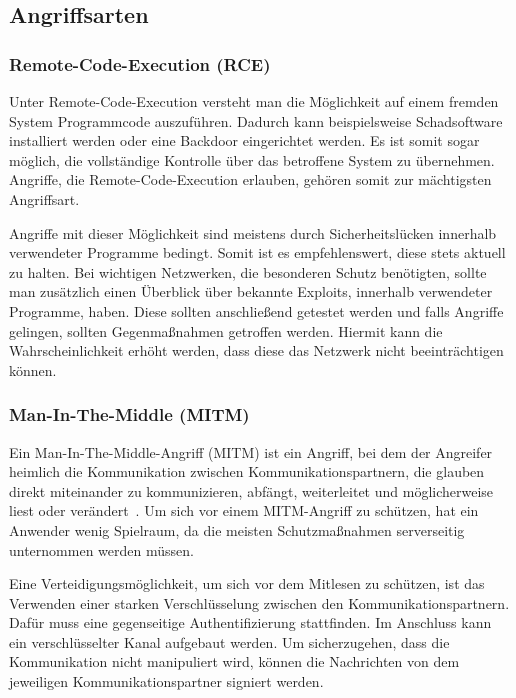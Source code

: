 \documentclass{AIFB_ITI_Crypto_Seminar}
\begin{document}
\subsection{Angriffsarten}
\subsubsection{Remote-Code-Execution (RCE)}
Unter Remote-Code-Execution versteht man die Möglichkeit auf einem fremden System Programmcode auszuführen. Dadurch kann beispielsweise Schadsoftware installiert werden oder eine Backdoor eingerichtet werden. Es ist somit sogar möglich, die vollständige Kontrolle über das betroffene System zu übernehmen. Angriffe, die Remote-Code-Execution erlauben, gehören somit zur mächtigsten Angriffsart. 

Angriffe mit dieser Möglichkeit sind meistens durch Sicherheitslücken innerhalb verwendeter Programme bedingt. Somit ist es empfehlenswert, diese stets aktuell zu halten. Bei wichtigen Netzwerken, die besonderen Schutz benötigten, sollte man zusätzlich einen Überblick über bekannte Exploits, innerhalb verwendeter Programme, haben. Diese sollten anschließend getestet werden und falls Angriffe gelingen, sollten Gegenmaßnahmen getroffen werden. Hiermit kann die Wahrscheinlichkeit erhöht werden, dass diese das Netzwerk nicht beeinträchtigen können.

\subsubsection{Man-In-The-Middle (MITM)}
Ein Man-In-The-Middle-Angriff (MITM) ist ein Angriff, bei dem der Angreifer heimlich die Kommunikation zwischen Kommunikationspartnern, die glauben direkt miteinander zu kommunizieren, abfängt, weiterleitet und möglicherweise liest oder verändert~\cite{mitm}. Um sich vor einem MITM-Angriff zu schützen, hat ein Anwender wenig Spielraum, da die meisten Schutzmaßnahmen serverseitig unternommen werden müssen. \par
Eine Verteidigungsmöglichkeit, um sich vor dem Mitlesen zu schützen, ist das Verwenden einer starken Verschlüsselung zwischen den Kommunikationspartnern. Dafür muss eine gegenseitige Authentifizierung stattfinden. Im Anschluss kann ein verschlüsselter Kanal aufgebaut werden. Um sicherzugehen, dass die Kommunikation nicht manipuliert wird, können die Nachrichten von dem jeweiligen Kommunikationspartner signiert werden.
\end{document}
